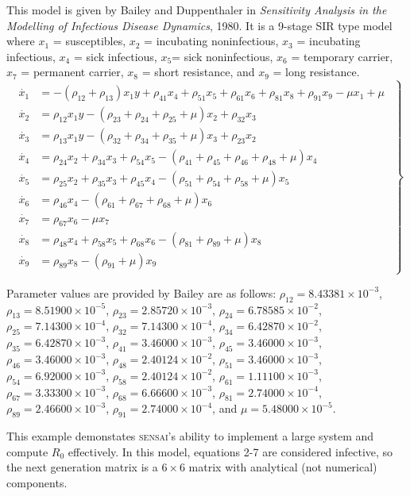 \documentclass[12pt]{article}
\newcommand{\sensai}{\textsc{sensai}}
\begin{document}
This model is given by Bailey and Duppenthaler in \textit{Sensitivity Analysis in the Modelling of Infectious Disease Dynamics}, 1980.  It is a 9-stage SIR type model where $x_1$ = susceptibles, $x_2$ = incubating noninfectious, $x_3$ = incubating infectious, $x_4$ = sick infectious, $x_5$= sick noninfectious, $x_6$ =  temporary carrier, $x_7$ = permanent carrier, $x_8$ = short resistance, and $x_9$ = long resistance.
%
\begin{equation*}\label{eq:typhoid}
\left.\begin{gathered}\begin{aligned}
\dot{x_1} &= -(\rho_{12}+\rho_{13})x_1y + \rho_{41}x_4+\rho_{51}x_5+\rho_{61}x_6+\rho_{81}x_8+\rho_{91}x_9-\mu x_1+\mu\\
\dot{x_2} &= \rho_{12}x_1y - (\rho_{23}+\rho_{24} +\rho_{25}+\mu)x_2 + \rho_{32}x_3\\
\dot{x_3} &= \rho_{13}x_1y - (\rho_{32}+\rho_{34}+\rho_{35}+\mu)x_3 + \rho_{23}x_2\\
\dot{x_4} &= \rho_{24}x_2 +\rho_{34}x_3 + \rho_{54}x_5-(\rho_{41}+\rho_{45}+\rho_{46}+\rho_{48}+\mu)x_4\\
\dot{x_5} &= \rho_{25}x_2 + \rho_{35}x_3+\rho_{45}x_4-(\rho_{51}+\rho_{54}+\rho_{58}+\mu)x_5 \\
\dot{x_6} &= \rho_{46}x_4-(\rho_{61}+\rho_{67}+\rho_{68}+\mu)x_6\\
\dot{x_7} &= \rho_{67}x_6 - \mu x_7\\
\dot{x_8} &= \rho_{48}x_4 + \rho_{58}x_5 + \rho_{68}x_6 - (\rho_{81}+\rho_{89}+\mu)x_8\\
\dot{x_9} &= \rho_{89}x_8 - (\rho_{91}+\mu)x_9
\end{aligned}\end{gathered}\right \}
\end{equation*}

Parameter values are provided by Bailey are as follows:  $\rho_{12} = 8.43381\times10^{-3}$, $\rho_{13} = 8.51900\times10^{-5}$,  $\rho_{23} = 2.85720\times10^{-3}$, $\rho_{24} = 6.78585\times10^{-2}$, $\rho_{25} = 7.14300\times10^{-4}$, $\rho_{32} = 7.14300\times10^{-4}$, $\rho_{34} = 6.42870\times10^{-2}$, $\rho_{35} = 6.42870\times10^{-3}$, $\rho_{41} = 3.46000\times10^{-3}$, $\rho_{45} = 3.46000\times10^{-3}$, $\rho_{46} = 3.46000\times10^{-3}$, $\rho_{48} = 2.40124\times10^{-2}$, $\rho_{51} = 3.46000\times10^{-3}$, $\rho_{54} = 6.92000\times10^{-3}$, $\rho_{58} = 2.40124\times10^{-2}$, $\rho_{61} = 1.11100\times10^{-3}$, $\rho_{67} = 3.33300\times10^{-3}$, $\rho_{68} = 6.66600\times10^{-3}$, $\rho_{81} = 2.74000\times10^{-4}$, $\rho_{89} = 2.46600\times10^{-3}$, $\rho_{91} = 2.74000\times10^{-4}$, and $\mu = 5.48000\times10^{-5}$.

This example demonstates {\sensai}'s ability to implement a large system and compute $R_0$ effectively.  In this model, equations 2-7 are considered infective, so the next generation matrix is a $6\times 6$ matrix with analytical (not numerical) components.
\end{document}
